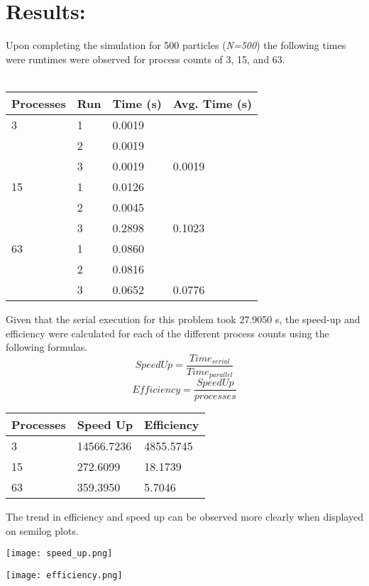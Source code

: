 \documentclass{article}
\begin{document}
\section*{Results:}
Upon completing the simulation for 500 particles (\textit{N=500})
the following times were runtimes were observed for process counts
of 3, 15, and 63.\\\\
\begin{center}
\begin{tabular}{llll}
Processes & Run & Time (s)     & Avg. Time (s)            \\ \hline
3    & 1   & 0.0019 &                \\ 
& 2   & 0.0019 &                \\
& 3   & 0.0019 & 0.0019 \\ \hline
15   & 1   & 0.0126 &                \\
& 2   & 0.0045 &                \\
& 3   & 0.2898  & 0.1023   \\ \hline
63   & 1   & 0.0860  &                \\
& 2   & 0.0816 &                \\
& 3   & 0.0652 & 0.0776 
\end{tabular}
\end{center}

Given that the serial execution for this problem took 27.9050 s,
the speed-up and efficiency were calculated for each of the different
process counts using the following formulas.
\[
Speed Up = \frac{Time_{serial}}{Time_{parallel}}
\]
\[
Efficiency = \frac{Speed Up}{processes}
\]
\begin{center}
\begin{tabular}{lll}
Processes & Speed Up    & Efficiency  \\ \hline
3         & 14566.7236 & 4855.5745 \\ \hline
15        & 272.6099 & 18.1739 \\ \hline
63        & 359.3950 & 5.7046
\end{tabular}
\end{center}

The trend in efficiency and speed up can be observed more clearly
when displayed on semilog plots.

\begin{center}
\texttt{[image: speed\_up.png]}
\end{center}

\begin{center}
\texttt{[image: efficiency.png]}
\end{center}
\end{document}
